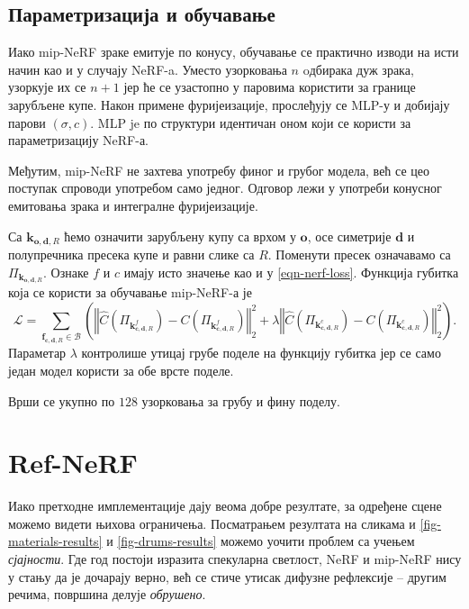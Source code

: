 \documentclass[12pt, a4paper, twoside]{book}
\numberwithin{equation}{chapter}
\numberwithin{theorem}{section}
\numberwithin{definition}{section}
\numberwithin{definitionChapter}{chapter}
\begin{document}
\subsection{Параметризација и обучавање}
Иако mip-NeRF зраке емитује по конусу, обучавање се практично изводи на исти начин као и у случају NeRF-a.
Уместо узорковања $n$ oдбирака дуж зрака, узоркује их се $n+1$ јер ће се узастопно у паровима користити
за границе зарубљене купе. Након примене фуријеизације, прослеђују се MLP-у и добијају парови $(\sigma, c)$.
MLP je по структури идентичан оном који се користи за параметризацију NeRF-а.

Међутим, mip-NeRF не захтева употребу финог и грубог модела, већ се цео поступак спроводи употребом само једног.
Одговор лежи у употреби конусног емитовања зрака и интегралне фуријеизације.

Са $\mathbf{k}_{\mathbf{o}, \mathbf{d}, R}$ ћемо означити зарубљену купу са врхом у $\mathbf{o}$, осе
симетрије $\mathbf{d}$ и полупречника пресека купе и равни слике са $R$. Поменути пресек означавамо са
$\Pi_{\mathbf{k}_{\mathbf{o}, \mathbf{d}, R}}$. Ознаке $f$ и $c$ имају исто значење као и у \ref{eqn-nerf-loss}.
Функција губитка која се користи за обучавање mip-NeRF-а је
\begin{equation}
	\mathcal{L} = \sum_{\mathbf{f}_{\mathbf{c}, \mathbf{d}, R} \in \mathcal{B}}
	\left(
	\left\Vert \hat{C}\left(\Pi_{\mathbf{k}^{f}_{\mathbf{c}, \mathbf{d}, R}}\right) -
		C\left(\Pi_{\mathbf{k}^{f}_{\mathbf{c}, \mathbf{d}, R}}\right) \right\Vert^2_2 +
	\lambda
	\left\Vert \hat{C}\left(\Pi_{\mathbf{k}^{c}_{\mathbf{c}, \mathbf{d}, R}}\right) -
		C\left(\Pi_{\mathbf{k}^{c}_{\mathbf{c}, \mathbf{d}, R}}\right) \right\Vert^2_2
	\right).
\end{equation}
Параметар $\lambda$ контролише утицај грубе поделе на функцију губитка јер се само један модел користи за обе врсте поделе.

Врши се укупно по $128$ узорковања за грубу и фину поделу.

\section{Ref-NeRF}
Иако претходне имплементације дају веома добре резултате, за одређене сцене можемо видети њихова ограничења.
Посматрањем резултата на сликама и \ref{fig-materials-results} и \ref{fig-drums-results} можемо уочити проблем
са учењем \textit{сјајности}. Где год постоји изразита спекуларна светлост, NeRF и mip-NeRF нису у стању да је
дочарају верно, већ се стиче утисак дифузне рефлексије -- другим речима, површина делује \textit{обрушено}.
\end{document}
